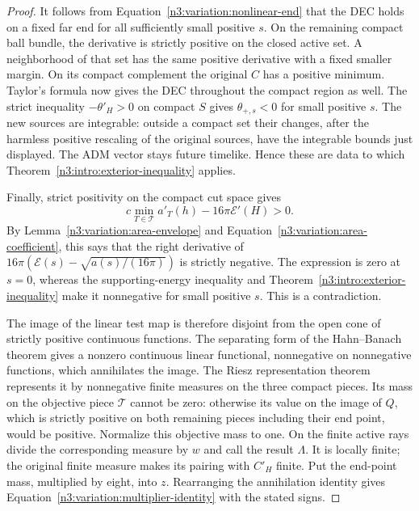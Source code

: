 \begin{proof}
It follows from Equation~\eqref{n3:variation:nonlinear-end} that the DEC
holds on a fixed far end for all sufficiently small positive $s$.
On the remaining compact ball bundle, the derivative is strictly
positive on the closed active set.  A neighborhood of that set has
the same positive derivative with a fixed smaller margin.  On its
compact complement the original $C$ has a positive minimum.
Taylor's formula now gives the DEC throughout the compact region
as well.  The strict inequality $-\theta'_H>0$ on compact $S$ gives
$\theta_{+,s}<0$ for small positive $s$.  The new sources are
integrable: outside a compact set their changes, after the harmless
positive rescaling of the original sources, have the integrable
bounds just displayed.  The ADM vector stays future timelike.
Hence these are data to which
Theorem~\ref{n3:intro:exterior-inequality} applies.

Finally, strict positivity on the compact cut space gives
\[
 c\min_{T\in\mathcal T}a'_T(h)-16\pi\mathcal E'(H)>0.
\]
By Lemma~\ref{n3:variation:area-envelope} and
Equation~\eqref{n3:variation:area-coefficient}, this says that the
right derivative of
$16\pi(\mathcal E(s)-\sqrt{a(s)/(16\pi)})$ is strictly negative.
The expression is zero at $s=0$, whereas the supporting-energy
inequality and Theorem~\ref{n3:intro:exterior-inequality} make it
nonnegative for small positive $s$.  This is a contradiction.

The image of the linear test map is therefore disjoint from the
open cone of strictly positive continuous functions.  The separating
form of the Hahn--Banach theorem gives a nonzero continuous linear
functional, nonnegative on nonnegative functions, which annihilates
the image.  The Riesz representation theorem represents it by
nonnegative finite measures on the three compact pieces.  Its mass
on the objective piece $\mathcal T$ cannot be zero: otherwise its
value on the image of $Q$, which is strictly positive on both
remaining pieces including their end point, would be positive.
Normalize this objective mass to one.  On the finite active rays
divide the corresponding measure by $w$ and call the result
$\Lambda$.  It is locally finite; the original finite measure makes
its pairing with $C'_H$ finite.  Put the end-point mass, multiplied
by eight, into $z$.  Rearranging the annihilation identity gives
Equation~\eqref{n3:variation:multiplier-identity} with the stated signs.
\end{proof}

